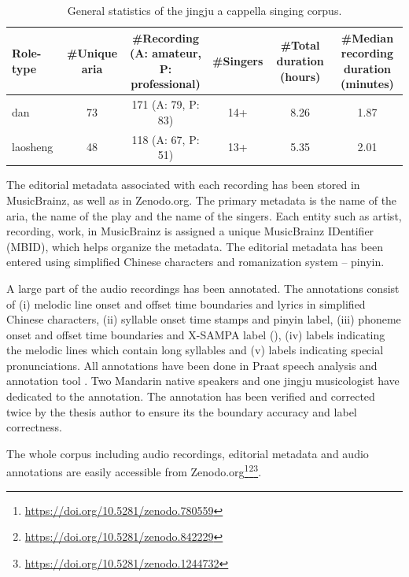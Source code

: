 \begin{landscape}
\mbox{}\vfill
\begin{table}[ht]
    \centering
    \caption{General statistics of the jingju a cappella singing corpus.}
    \label{table:ch4:general_statistics_jingju_a_cappella_corpus}
    \begin{tabular}{l|ccccc}
        \toprule
        Role-type & \#Unique aria & \makecell{\#Recording\\(A: amateur,\\P: professional)} & \#Singers & \makecell{\#Total duration\\(hours)} & \makecell{\#Median recording\\duration (minutes)} \\
        \midrule
        dan           & 73 & 171 (A: 79, P: 83) & 14+ & 8.26 & 1.87 \\
        laosheng      & 48 & 118 (A: 67, P: 51) & 13+ & 5.35 & 2.01 \\
        \bottomrule
    \end{tabular}
\end{table}
\vfill
\end{landscape}

The editorial metadata associated with each recording has been stored in MusicBrainz, as well as in Zenodo.org. The primary metadata is the name of the aria, the name of the play and the name of the singers. Each entity such as artist, recording, work, in MusicBrainz is assigned a unique MusicBrainz IDentifier (MBID), which helps organize the metadata. The editorial metadata has been entered using simplified Chinese characters and romanization system -- pinyin. 

A large part of the audio recordings has been annotated. The annotations consist of (i) melodic line onset and offset time boundaries and lyrics in simplified Chinese characters, (ii) syllable onset time stamps and pinyin label, (iii) phoneme onset and offset time boundaries and X-SAMPA label (), (iv) labels indicating the melodic lines which contain long syllables and (v) labels indicating special pronunciations. All annotations have been done in Praat speech analysis and annotation tool \cite{boersma_praat_2001}. Two Mandarin native speakers and one jingju musicologist have dedicated to the annotation. The annotation has been verified and corrected twice by the thesis author to ensure its the boundary accuracy and label correctness.

The whole corpus including audio recordings, editorial metadata and audio annotations are easily accessible from Zenodo.org\footnote{\url{https://doi.org/10.5281/zenodo.780559}}\footnote{\url{https://doi.org/10.5281/zenodo.842229}}\footnote{\url{https://doi.org/10.5281/zenodo.1244732}}.

